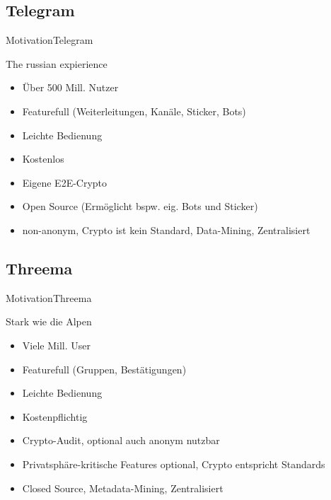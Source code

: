 \subsection{Telegram}
\begin{frame}{Motivation}{Telegram}
	\begin{block}{The russian expierience}
		\begin{itemize}[<+->]
			\item Über 500 Mill. Nutzer
			\item Featurefull (Weiterleitungen, Kanäle, Sticker, Bots)
			\item Leichte Bedienung
			\item Kostenlos
			\item Eigene E2E-Crypto
			\item \color{green} Open Source (Ermöglicht bspw. eig. Bots und Sticker)
			\item \color{red} non-anonym, Crypto ist kein Standard, Data-Mining, Zentralisiert
		\end{itemize}
	\end{block}
\end{frame}

\subsection{Threema}
\begin{frame}{Motivation}{Threema}
	\begin{block}{Stark wie die Alpen}
		\begin{itemize}[<+->]
			\item Viele Mill. User
			\item Featurefull (Gruppen, Bestätigungen)
			\item Leichte Bedienung
			\item Kostenpflichtig
			\item Crypto-Audit, optional auch anonym nutzbar
			\item \color{green} Privatsphäre-kritische Features optional, Crypto entspricht Standards
			\item \color{red} Closed Source, Metadata-Mining, Zentralisiert
		\end{itemize}
	\end{block}
\end{frame}

